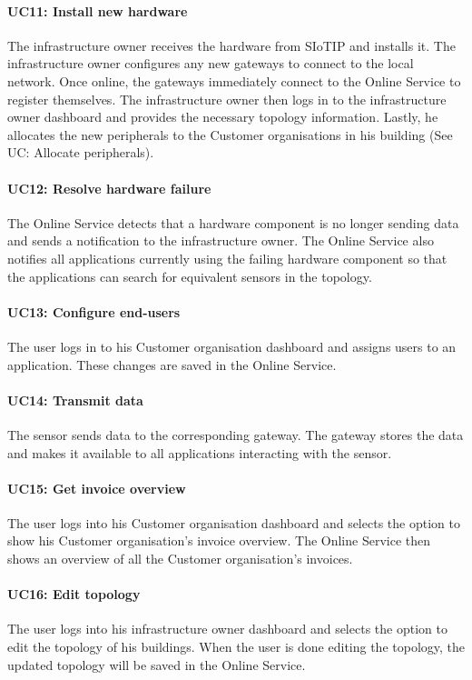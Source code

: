 \documentclass[english]{sareport}
\begin{document}
\paragraph{UC11: Install new hardware}
The infrastructure owner receives the hardware from SIoTIP and installs it. The infrastructure owner configures any new gateways to connect to the local network. Once online, the gateways immediately connect to the Online Service to register themselves. The infrastructure owner then logs in to the infrastructure owner dashboard and provides the necessary topology information. Lastly, he allocates the new peripherals to the Customer organisations in his building (See UC: Allocate peripherals).

\paragraph{UC12: Resolve hardware failure}
The Online Service detects that a hardware component is no longer sending data and sends a notification to the infrastructure owner. The Online Service also notifies all applications currently using the failing hardware component so that the applications can search for equivalent sensors in the topology. 

\paragraph{UC13: Configure end-users}
The user logs in to his Customer organisation dashboard and assigns users to an application. These changes are saved in the Online Service.

\paragraph{UC14: Transmit data}
The sensor sends data to the corresponding gateway. The gateway stores the data and makes it available to all applications interacting with the sensor.

\paragraph{UC15: Get invoice overview}
The user logs into his Customer organisation dashboard and selects the option to show his Customer organisation's invoice overview. The Online Service then shows an overview of all the Customer organisation's invoices.

\paragraph{UC16: Edit topology}
The user logs into his infrastructure owner dashboard and selects the option to edit the topology of his buildings. When the user is done editing the topology, the updated topology will be saved in the Online Service.
\end{document}
